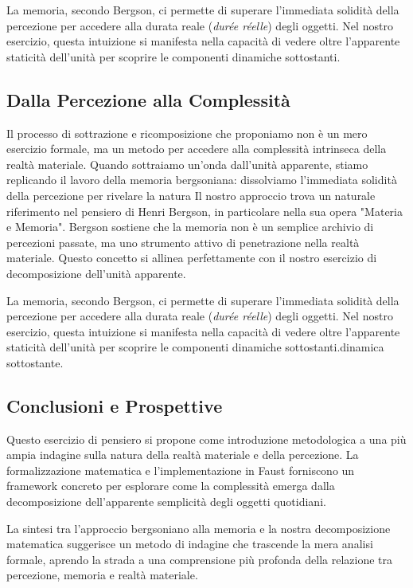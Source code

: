 \documentclass[a4paper,11pt]{article}
\begin{document}
La memoria, secondo Bergson, ci permette di superare l'immediata
solidità della percezione per accedere alla durata reale (\emph{durée
réelle}) degli oggetti. Nel nostro esercizio, questa intuizione si
manifesta nella capacità di vedere oltre l'apparente staticità
dell'unità per scoprire le componenti dinamiche sottostanti.

\subsection{Dalla Percezione alla Complessità}\hypertarget{dalla-percezione-alla-complessit}{}\label{dalla-percezione-alla-complessit}

Il processo di sottrazione e ricomposizione che proponiamo non è un mero
esercizio formale, ma un metodo per accedere alla complessità intrinseca
della realtà materiale. Quando sottraiamo un'onda dall'unità apparente,
stiamo replicando il lavoro della memoria bergsoniana: dissolviamo
l'immediata solidità della percezione per rivelare la natura Il nostro approccio trova un naturale riferimento nel pensiero di Henri
Bergson, in particolare nella sua opera "Materia e Memoria". Bergson
sostiene che la memoria non è un semplice archivio di percezioni
passate, ma uno strumento attivo di penetrazione nella realtà materiale.
Questo concetto si allinea perfettamente con il nostro esercizio di
decomposizione dell'unità apparente.

La memoria, secondo Bergson, ci permette di superare l'immediata
solidità della percezione per accedere alla durata reale (\emph{durée
réelle}) degli oggetti. Nel nostro esercizio, questa intuizione si
manifesta nella capacità di vedere oltre l'apparente staticità
dell'unità per scoprire le componenti dinamiche sottostanti.dinamica
sottostante.

\subsection{Conclusioni e Prospettive}\hypertarget{conclusioni-e-prospettive}{}\label{conclusioni-e-prospettive}

Questo esercizio di pensiero si propone come introduzione metodologica a
una più ampia indagine sulla natura della realtà materiale e della
percezione. La formalizzazione matematica e l'implementazione in Faust
forniscono un framework concreto per esplorare come la complessità
emerga dalla decomposizione dell'apparente semplicità degli oggetti
quotidiani.

La sintesi tra l'approccio bergsoniano alla memoria e la nostra
decomposizione matematica suggerisce un metodo di indagine che trascende
la mera analisi formale, aprendo la strada a una comprensione più
profonda della relazione tra percezione, memoria e realtà materiale.
\end{document}
